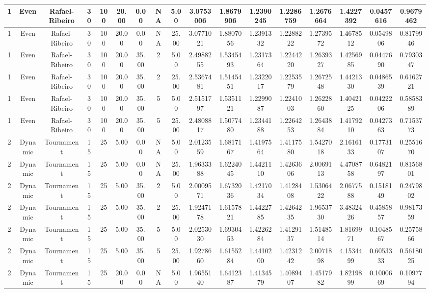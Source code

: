 \begin{longtable}{ | c | c | c | c | c | c | c | c | c | c | c | c | c | c | c | c | c | }
	\hline
	1	&	Even	&	Rafael-Ribeiro	&	30	&	100	&	20.00	&	0.00	&	NA	&	5.00	&	3.0753006	&	1.8679906	&	1.2390245	&	1.2286759	&	1.2676664	&	1.4227392	&	0.0457616	&	0.9679462 \\
	\hline
	1	&	Even	&	Rafael-Ribeiro	&	30	&	100	&	20.00	&	0.00	&	NA	&	25.00	&	3.0771021	&	1.8807056	&	1.2391332	&	1.2288222	&	1.2739572	&	1.4678512	&	0.0549806	&	0.8179946 \\
	\hline
	1	&	Even	&	Rafael-Ribeiro	&	30	&	100	&	20.00	&	35.00	&	2	&	5.00	&	2.4988255	&	1.5345493	&	1.2317364	&	1.2244220	&	1.2639327	&	1.4256985	&	0.0447690	&	0.7930347 \\
	\hline
	1	&	Even	&	Rafael-Ribeiro	&	30	&	100	&	20.00	&	35.00	&	2	&	25.00	&	2.5367481	&	1.5145451	&	1.2322017	&	1.2253579	&	1.2672548	&	1.4421330	&	0.0486539	&	0.6162721 \\
	\hline
	1	&	Even	&	Rafael-Ribeiro	&	30	&	100	&	20.00	&	35.00	&	5	&	5.00	&	2.5151797	&	1.5351121	&	1.2299087	&	1.2241003	&	1.2622860	&	1.4042125	&	0.0422206	&	0.5858389 \\
	\hline
	1	&	Even	&	Rafael-Ribeiro	&	30	&	100	&	20.00	&	35.00	&	5	&	25.00	&	2.4808817	&	1.5077480	&	1.2344188	&	1.2264253	&	1.2643884	&	1.4179210	&	0.0427363	&	0.7153773 \\
	\hline
	2	&	Dynamic	&	Tournament	&	15	&	25	&	5.00	&	0.00	&	NA	&	5.00	&	2.0123559	&	1.6817167	&	1.4197564	&	1.4117580	&	1.5427018	&	2.1616133	&	0.1773107	&	0.2551670 \\
	\hline
	2	&	Dynamic	&	Tournament	&	15	&	25	&	5.00	&	0.00	&	NA	&	25.00	&	1.9633388	&	1.6224045	&	1.4421110	&	1.4263606	&	2.0069113	&	4.4708758	&	0.6482197	&	0.8156801 \\
	\hline
	2	&	Dynamic	&	Tournament	&	15	&	25	&	5.00	&	35.00	&	2	&	5.00	&	2.0009571	&	1.6732036	&	1.4217034	&	1.4128408	&	1.5306422	&	2.0677588	&	0.1518149	&	0.2479802 \\
	\hline
	2	&	Dynamic	&	Tournament	&	15	&	25	&	5.00	&	35.00	&	2	&	25.00	&	1.9247178	&	1.6157821	&	1.4422785	&	1.4264235	&	1.9653730	&	3.4832426	&	0.4585857	&	0.9817359 \\
	\hline
	2	&	Dynamic	&	Tournament	&	15	&	25	&	5.00	&	35.00	&	5	&	5.00	&	2.0253030	&	1.6930453	&	1.4226284	&	1.4129137	&	1.5148514	&	1.8169971	&	0.1048567	&	0.2575866 \\
	\hline
	2	&	Dynamic	&	Tournament	&	15	&	25	&	5.00	&	35.00	&	5	&	25.00	&	1.9278660	&	1.6155284	&	1.4410200	&	1.4231242	&	2.0071898	&	4.1534499	&	0.6053333	&	0.5618025 \\
	\hline
	2	&	Dynamic	&	Tournament	&	15	&	25	&	20.00	&	0.00	&	NA	&	5.00	&	1.9655140	&	1.6412387	&	1.4134579	&	1.4089407	&	1.4517982	&	1.8219899	&	0.1000669	&	0.1097794 \\

\end{longtable}
